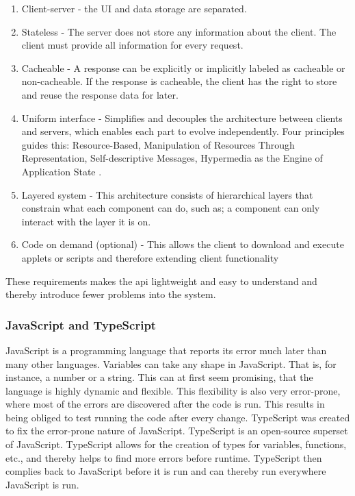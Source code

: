 \begin{enumerate}
  \item Client-server - the UI and data storage are separated. 
  \item Stateless - The server does not store any information about the client. The client must provide all information for every request. 
  \item Cacheable - A response can be explicitly or implicitly labeled as cacheable or non-cacheable. If the response is cacheable, the client has the right to store and reuse the response data for later. 
  \item Uniform interface - Simplifies and decouples the architecture between clients and servers, which enables each part to evolve independently. Four principles guides this: Resource-Based, Manipulation of Resources Through Representation, Self-descriptive Messages, Hypermedia as the Engine of Application State\cite{WhatREST} . 
  \item Layered system - This architecture consists of hierarchical layers that constrain what each component can do, such as; a component can only interact with the layer it is on. 
  \item Code on demand (optional) - This allows the client to download and execute applets or scripts and therefore extending client functionality 
\end{enumerate}

These requirements makes the \acrshort{api} lightweight and easy to understand and thereby introduce fewer problems into the system. 


\subsubsection{JavaScript and TypeScript}%
\label{ssub:JavaScript and TypeScript}
JavaScript is a programming language that reports its error much later than many other languages. Variables can take any shape in JavaScript. That is, for instance, a number or a string. This can at first seem promising, that the language is highly dynamic and flexible. This flexibility is also very error-prone, where most of the errors are discovered after the code is run. This results in being obliged to test running the code after every change\cite{taivalsaari2008web}. TypeScript was created to fix the error-prone nature of JavaScript. TypeScript is an open-source superset of JavaScript. TypeScript allows for the creation of types for variables, functions, etc., and thereby helps to find more errors before runtime\cite{WhyYouShould}. TypeScript then complies back to JavaScript before it is run and can thereby run everywhere JavaScript is run\cite{WhyYouShould}.  


